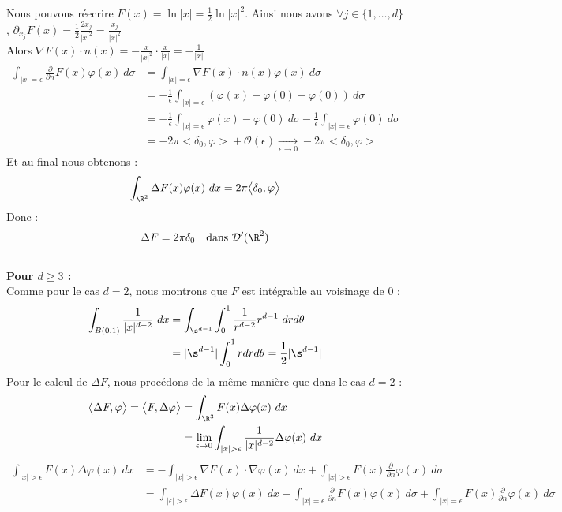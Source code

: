 Nous pouvons réecrire $F(x) = \ln|x| = \frac{1}{2} \ln|x|^2$. 
Ainsi nous avons $\forall j \in \{ 1, \dots, d \}$, $\partial_{x_j}F(x) = \frac{1}{2} \frac{2x_j}{|x|^2} = \frac{x_j}{|x|^2} $\\
Alors $\nabla F(x) \cdot n(x) = - \frac{x}{|x|^2} \cdot \frac{x}{|x|} = - \frac{1}{|x|} $
\begin{align*}
    \int_{|x| =\epsilon}  \frac{\partial}{\partial n}F(x) \varphi(x) \ d\sigma &=  \int_{|x|=\epsilon} \nabla F(x) \cdot n(x) \varphi(x) \ d\sigma \\
    &= - \frac{1}{\epsilon} \int_{|x|=\epsilon} (\varphi(x) - \varphi(0) + \varphi(0)) \ d\sigma \\
    &= - \frac{1}{\epsilon} \int_{|x|=\epsilon} \varphi(x) - \varphi(0) \ d\sigma - \frac{1}{\epsilon} \int_{|x|=\epsilon} \varphi(0) \ d\sigma \\
    &= -2\pi \big< \delta_0,\varphi \big> + \mathcal{O}(\epsilon) \xrightarrow[\epsilon \to 0]{} -2\pi \big< \delta_0,\varphi \big> 
\end{align*}
Et au final nous obtenons :
$$\int_{\R^2} \Delta F(x) \varphi(x) \ dx = 2\pi\big< \delta_0,\varphi \big> $$
Donc :
$$\Delta F = 2\pi \delta_0 \quad \text{dans } \mathcal{D}'(\R^2)$$
\\
\textbf{Pour $d \geq 3$ :}\\
Comme pour le cas $d = 2$, nous montrons que $F$ est intégrable au voisinage de 0 : 
\begin{align*}
    \int_{B(0,1)} \frac{1}{|x|^{d-2}} \ dx &= \int_{\s^{d-1}} \int_0^1 \frac{1}{r^{d-2}} r^{d - 1} \ dr d\theta \\
    &= |\s^{d-1}| \int_0^1 r dr d\theta = \frac{1}{2} |\s^{d-1}|
\end{align*}
Pour le calcul de $\Delta F$, nous procédons de la même manière que dans le cas $d = 2$ :
\begin{align*}
    \big< \Delta F, \varphi \big> = \big< F,\Delta \varphi \big> &= \int_{\R^3} F(x) \Delta \varphi(x) \ dx \\
    &= \underset{\epsilon \to 0}{\lim} \int_{|x|>\epsilon} \frac{1}{|x|^{d-2}} \Delta \varphi(x) \ dx
\end{align*}
\begin{align*}
    \int_{|x|>\epsilon} F(x) \Delta \varphi(x) \ dx &= - \int_{|x|>\epsilon} \nabla F(x) \cdot \nabla \varphi(x) \ dx + \int_{|x|>\epsilon} F(x)\frac{\partial}{\partial n}\varphi(x) \ d\sigma \\
    &= \int_{|\epsilon|>\epsilon} \Delta F(x) \varphi(x) \ dx - \int_{|x|=\epsilon} \frac{\partial}{\partial n}F(x) \varphi(x) \ d\sigma + \int_{|x|=\epsilon} F(x) \frac{\partial}{\partial n}\varphi(x) \ d\sigma
\end{align*}
